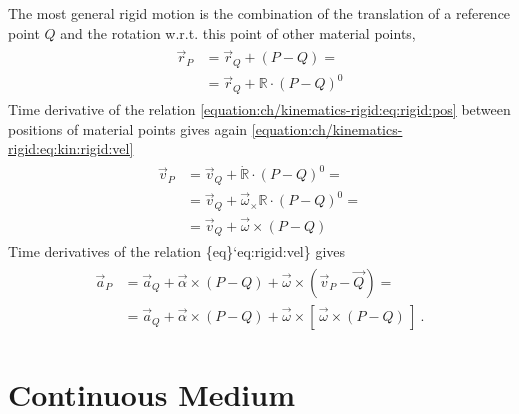 \documentclass[letterpaper,10pt,english]{jupyterBook}
\begin{document}
\sphinxAtStartPar
{}
The most general rigid motion is the combination of the translation of a reference point \(Q\) and the rotation w.r.t. this point of other material points,
\begin{equation}\label{equation:ch/kinematics-rigid:eq:rigid:pos}
\begin{split}\begin{aligned}
  \vec{r}_P
  & = \vec{r}_Q + (P - Q) = \\
  & = \vec{r}_Q + \mathbb{R} \cdot (P-Q)^0 
\end{aligned}\end{split}
\end{equation}
\sphinxAtStartPar
{}
Time derivative of the relation \eqref{equation:ch/kinematics-rigid:eq:rigid:pos} between positions of material points gives again \eqref{equation:ch/kinematics-rigid:eq:kin:rigid:vel}
\begin{equation}\label{equation:ch/kinematics-rigid:eq:rigid:vel}
\begin{split}\begin{aligned}
  \vec{v}_P
  & = \vec{v}_Q + \dot{\mathbb{R}} \cdot (P-Q)^0 = \\
  & = \vec{v}_Q + \vec{\omega}_{\times} \mathbb{R} \cdot (P-Q)^0 = \\
  & = \vec{v}_Q + \vec{\omega} \times (P-Q)
\end{aligned}\end{split}
\end{equation}
\sphinxAtStartPar
{}
Time derivatives of the relation \{eq\}`eq:rigid:vel\} gives
\begin{equation*}
\begin{split}\begin{aligned}
\vec{a}_P 
 & = \vec{a}_Q + \vec{\alpha} \times (P-Q) + \vec{\omega} \times \left( \vec{v}_P - \vec{Q} \right) = \\
 & = \vec{a}_Q + \vec{\alpha} \times (P-Q) + \vec{\omega} \times \left[ \, \vec{\omega} \times (P - Q) \, \right] \ .
\end{aligned}\end{split}
\end{equation*}


\sphinxstepscope


\section{Continuous Medium}
\label{\detokenize{ch/kinematics-continuum:continuous-medium}}\label{\detokenize{ch/kinematics-continuum:classical-mechanics-kinematics-contiuum}}\label{\detokenize{ch/kinematics-continuum::doc}}
\sphinxstepscope
\end{document}
